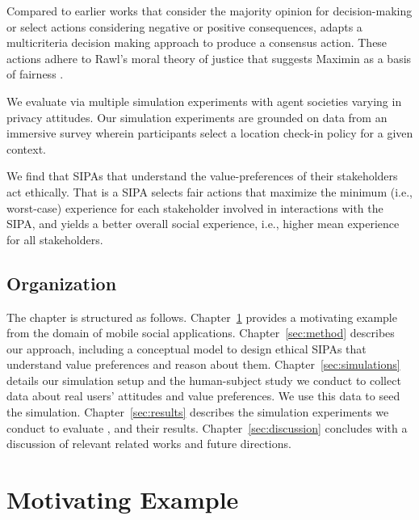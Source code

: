 Compared to earlier works \citep{TOCHI-17:Multiuser} that 
consider the majority opinion for decision-making or select actions considering negative or 
positive consequences, \frameworkAinur adapts a multicriteria decision
making approach \citep{opricovic2004compromise} to produce a consensus action.  
These actions adhere to Rawl's moral theory of justice 
that suggests Maximin as a basis of fairness \citep{rawls1985justice}. 

We evaluate \frameworkAinur via
multiple simulation experiments with agent societies varying in privacy
attitudes. Our simulation experiments are grounded on 
data from an immersive survey wherein participants select a location check-in policy 
for a given context.

We find that \frameworkAinur SIPAs that understand the value-preferences of their
stakeholders act ethically. 
That is a SIPA selects fair actions that maximize the minimum (i.e., worst-case) experience for each stakeholder involved in interactions with the SIPA, and yields a better overall social experience, i.e., higher mean experience for all stakeholders.

\subsection{Organization}
The chapter is structured as follows. Chapter~\ref{sec:example} provides a
motivating example from the domain of mobile social applications.
Chapter~\ref{sec:method} describes our approach, including a conceptual
model to design ethical SIPAs that understand value preferences and
reason about them. Chapter~\ref{sec:simulations} details our simulation
setup and the human-subject study we conduct to collect data about real
users' attitudes and value preferences. We use this data to seed the
simulation. Chapter~\ref{sec:results} describes the simulation
experiments we conduct to evaluate \frameworkAinur, and their results.
Chapter~\ref{sec:discussion} concludes with a discussion of relevant
related works and future directions.

\section{Motivating Example}
\label{sec:example}

